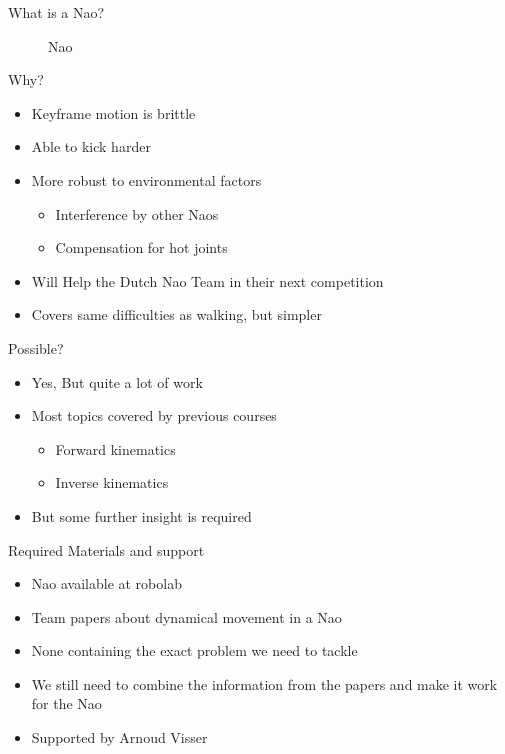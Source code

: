 \documentclass{beamer}
\begin{document}
\begin{frame}{What is a Nao?}
\begin{figure}[H]
\begin{center}
            \caption{Nao}
        \end{center}
    \end{figure}  
\end{frame}

\begin{frame}{Why?}
    \begin{itemize}
        \item{Keyframe motion is brittle}
        \item{Able to kick harder}
        \item{More robust to environmental factors}
            \begin{itemize}
                \item{Interference by other Naos}
                \item{Compensation for hot joints}
            \end{itemize} 
        \item{Will Help the Dutch Nao Team in their next competition}
        \item{Covers same difficulties as walking, but simpler}
    \end{itemize}
\end{frame}

\begin{frame}{Possible?}
    \begin{itemize}
        \item{Yes, But quite a lot of work}
        \item{Most topics covered by previous courses}
            \begin{itemize}
                \item{Forward kinematics}
                \item{Inverse kinematics}
            \end{itemize}
        \item{But some further insight is required }
    \end{itemize}
\end{frame}

\begin{frame}{Required Materials and support}
    \begin{itemize}
        \item{Nao available at robolab}
        \item{Team papers about dynamical movement in a Nao} 
        \item{None containing the exact problem we need to tackle}
        \item{We still need to combine the information from the papers and make
            it work for the Nao} 

        \item{Supported by Arnoud Visser}
    \end{itemize}
\end{frame}
\end{document}
